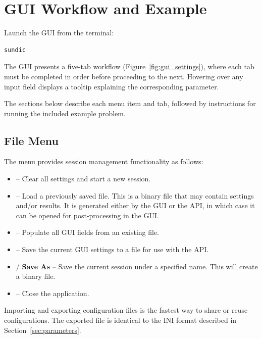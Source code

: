 \chapter{GUI Workflow and Example}
\label{sec:gui}

Launch the GUI from the terminal:

\begin{lstlisting}[language=bash]
sundic
\end{lstlisting}

The GUI presents a five-tab workflow (Figure~\ref{fig:gui_settings}), where each tab must be completed in order before proceeding to the next. Hovering over any input field displays a tooltip explaining the corresponding parameter.

The sections below describe each menu item and tab, followed by instructions for running the included example problem.

\section{File Menu}

The  menu provides session management functionality as follows:

\begin{itemize}
	\item {} -- Clear all settings and start a new session.
	\item {} -- Load a previously saved  file. This is a binary file that may contain settings and/or results. It is generated either by the GUI or the API, in which case it can be opened for post-processing in the GUI.
	\item {} -- Populate all GUI fields from an existing  file.
	\item {} -- Save the current GUI settings to a  file for use with the API.
	\item {} / \textbf{Save As} -- Save the current session under a specified name. This will create a  binary file.
	\item {} -- Close the application.
\end{itemize}

Importing and exporting configuration files is the fastest way to share or reuse configurations. The exported file is identical to the INI format described in Section~\ref{sec:parameters}.

